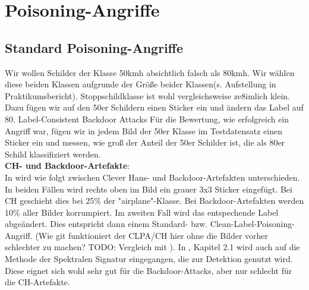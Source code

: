 \documentclass[twoside, 11pt,a4paper]{article}
\numberwithin{equation}{section}
\begin{document}
	
	\section{Poisoning-Angriffe} \label{chapter_poisoningattacks}
	\subsection{Standard Poisoning-Angriffe}
	Wir wollen Schilder der Klasse 50kmh absichtlich falsch als 80kmh. Wir wählen diese beiden Klassen aufgrunde der Größe beider Klassen(s. Aufstellung in Praktikumsbericht). Stoppschildklasse ist wohl vergleichsweise ze8imlich klein.\\
	
	Dazu fügen wir auf den 50er Schildern einen Sticker ein und ändern das Label auf 80.
	Label-Consistent
	Backdoor Attacks
	Für die Bewertung, wie erfolgreich ein Angriff war, fügen wir in jedem Bild der 50er Klasse im Testdatensatz einen Sticker ein und messen, wie groß der Anteil der 50er Schilder ist, die als 80er Schild klassifiziert werden.\\
	
	\noindent \textbf{CH- und Backdoor-Artefakte}:\\
	In \cite{imagenet_unhansed_v2} wird wie folgt zwischen Clever Hans- und Backdoor-Artefakten unterschieden. In beiden Fällen wird rechts oben im Bild ein grauer 3x3 Sticker eingefügt.
	Bei CH geschieht dies bei $25 \%$ der "airplane"-Klasse. Bei Backdoor-Artefakten werden $10 \%$ aller Bilder korrumpiert. Im zweiten Fall wird das entspechende Label abgeändert. Dies entspricht dann einem Standard- bzw. Clean-Label-Poisoning-Angriff. (Wie git funktioniert der CLPA/CH hier ohne die Bilder vorher schlechter zu machen? TODO: Vergleich mit \cite{labelconsistent}). In \cite{imagenet_unhansed_v2}, Kapitel 2.1 wird auch auf die Methode der Spektralen Signatur \cite{spectral_signatures} eingegangen, die zur Detektion genutzt wird. Diese eignet sich wohl sehr gut für die Backdoor-Attacks, aber nur schlecht für die CH-Artefakte.
	
	
\end{document}
